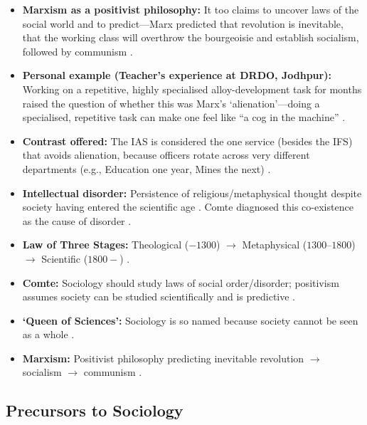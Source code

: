 \begin{GovtPolicy}
\begin{itemize}
    \item \textbf{Marxism as a positivist philosophy:} It too claims to uncover laws of the social world and to predict---Marx predicted that revolution is inevitable, that the working class will overthrow the bourgeoisie and establish socialism, followed by communism .
    \item \textbf{Personal example (Teacher's experience at DRDO, Jodhpur):} Working on a repetitive, highly specialised alloy-development task for months raised the question of whether this was Marx's `alienation'---doing a specialised, repetitive task can make one feel like ``a cog in the machine'' .
    \item \textbf{Contrast offered:} The IAS is considered the one service (besides the IFS) that avoids alienation, because officers rotate across very different departments (e.g., Education one year, Mines the next) .
\end{itemize}
\end{GovtPolicy}

\begin{QuickRevision}
\begin{itemize}
    \item \textbf{Intellectual disorder:} Persistence of religious/metaphysical thought despite society having entered the scientific age . Comte diagnosed this co-existence as the cause of disorder .
    \item \textbf{Law of Three Stages:} Theological ($-\text{1300}$) $\rightarrow$ Metaphysical ($1300\text{--}1800$) $\rightarrow$ Scientific ($1800-$) .
    \item \textbf{Comte:} Sociology should study laws of social order/disorder; positivism assumes society can be studied scientifically and is predictive .
    \item \textbf{`Queen of Sciences':} Sociology is so named because society cannot be seen as a whole .
    \item \textbf{Marxism:} Positivist philosophy predicting inevitable revolution $\rightarrow$ socialism $\rightarrow$ communism .
\end{itemize}
\end{QuickRevision}

\subsection{Precursors to Sociology}

